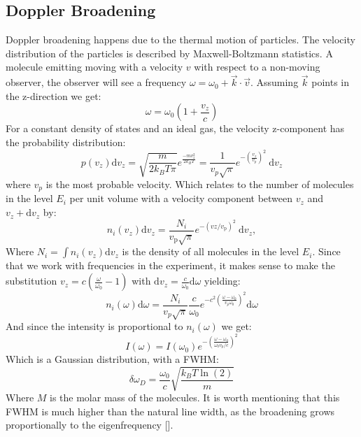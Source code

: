 \documentclass{article}
\begin{document}
\subsection{Doppler Broadening}
Doppler broadening happens due to the thermal motion of particles. The velocity distribution of the particles is described by Maxwell-Boltzmann statistics. A molecule emitting moving with a velocity $v$ with respect to a non-moving observer, the observer will see a frequency $\omega = \omega_0 + \vec{k} \cdot \vec{v}$. Assuming $\vec{k}$ points in the z-direction we get: 
\begin{equation}
    \omega = \omega_0(1+\frac{v_z}{c})
\end{equation}
For a constant density of states and an ideal gas, the velocity z-component has the probability distribution: 
\begin{equation}
    p\left(v_z\right) \mathrm{d} v_z=\sqrt{\frac{m}{2 k_B T \pi}} e^{\frac{-m v_z^2}{2k_BT}}=\frac{1}{v_p \sqrt{\pi}} e^{-\left(\frac{v_z}{v_p}\right)^2} \mathrm{~d} v_z  
\end{equation}
where $v_p$ is the most probable velocity. Which relates to the number of molecules in the level $E_i$ per unit volume with a velocity component between $v_z$ and $v_z+\mathrm{d} v_z$ by: 
\begin{equation}
    n_i\left(v_z\right) \mathrm{d} v_z=\frac{N_i}{v_{\mathrm{p}} \sqrt{\pi}} e^{-\left(v z / v_{\mathrm{p}}\right)^2} \mathrm{~d} v_z,
\end{equation}
Where $N_i=\int n_i\left(v_z\right) \mathrm{d} v_z$ is the density of all molecules in the level $E_i$. Since that we work with frequencies in the experiment, it makes sense to make the substitution $v_z = c(\frac{\omega}{\omega_0}-1)$ with $\mathrm{d}v_z = \frac{c}{\omega_0}\mathrm{d}\omega$ yielding: 
\begin{equation}
    n_i(\omega) \mathrm{d} \omega=\frac{N_i}{v_p \sqrt{\pi}} \frac{c}{\omega_0} e^{-c^2\left(\frac{\omega-\omega_0}{v_p \omega_0}\right)^2}\mathrm{d}\omega
\end{equation}
And since the intensity is proportional to $n_i(\omega)$ we get: 
\begin{equation}
    I(\omega) =I\left(\omega_0\right) e^{-\left(\frac{\omega-\omega_0}{\omega_0 v_p/c} \right)^2}
\end{equation}
Which is a Gaussian distribution, with a FWHM: 
\begin{equation}
    \delta \omega_D =\frac{\omega_0}{c} \sqrt{\frac{k_B T \ln(2)}{m}}
\end{equation}
Where $M$ is the molar mass of the molecules. It is worth mentioning that this FWHM is much higher than the natural line width, as the broadening grows proportionally to the eigenfrequency [\cite{jung_2018_dopplerfree}].
\end{document}
